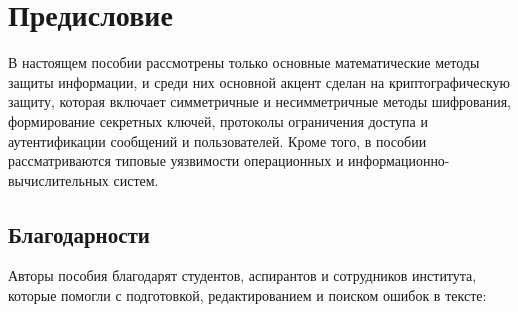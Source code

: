 \chapter*{Предисловие}

В настоящем пособии рассмотрены только основные математические методы защиты информации, и среди них основной акцент сделан на криптографическую защиту, которая включает симметричные и несимметричные методы шифрования, формирование секретных ключей, протоколы ограничения доступа и аутентификации сообщений и пользователей. Кроме того, в пособии рассматриваются типовые уязвимости операционных и информационно-вычислительных систем.

\section*{Благодарности}
Авторы пособия благодарят студентов, аспирантов и сотрудников института, которые помогли с подготовкой, редактированием и поиском ошибок в тексте:

